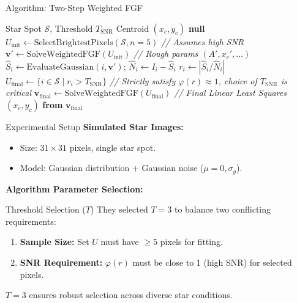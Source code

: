 \begin{frame}{Algorithm: Two-Step Weighted FGF}
    \begin{algorithm}[H]
    \scriptsize
    \caption{Two-Step Weighted Fast Gaussian Fitting}
    \begin{algorithmic}[1]
        \REQUIRE Star Spot $\mathcal{S}$, Threshold $T_{\text{SNR}}$
        \ENSURE Centroid $(x_c, y_c)$
            \RETURN \textbf{null}
        \ENDIF
        \STATE $U_{\text{init}} \gets \text{SelectBrightestPixels}(\mathcal{S}, n=5)$ \quad \textit{// Assumes high SNR}
        \STATE $\mathbf{v}' \gets \text{SolveWeightedFGF}(U_{\text{init}})$ \quad \textit{// Rough params $(A', x_c', \dots)$}
            \STATE $\hat{S}_i \gets \text{EvaluateGaussian}(i, \mathbf{v}')$; 
            \STATE $\hat{N}_i \gets I_i - \hat{S}_i$
            \STATE $r_i \gets |\hat{S}_i / \hat{N}_i|$
        \ENDFOR
        \STATE $U_{\text{final}} \gets \{ i \in \mathcal{S} \mid r_i > T_{\text{SNR}} \}$ \quad \textit{// Strictly satisfy $\varphi(r) \approx 1$, choice of $T_{\text{SNR}}$ is critical}
        \STATE $\mathbf{v}_{\text{final}} \gets \text{SolveWeightedFGF}(U_{\text{final}})$ \quad \textit{// Final Linear Least Squares}
        \RETURN $(x_c, y_c)$ \textbf{from} $\mathbf{v}_{\text{final}}$
    \end{algorithmic}
    \end{algorithm}
\end{frame}

\begin{frame}{Experimental Setup}
    \textbf{Simulated Star Images:}
    \begin{itemize}
        \item Size: $31 \times 31$ pixels, single star spot.
        \item Model: Gaussian distribution + Gaussian noise ($\mu=0, \sigma_g$).
    \end{itemize}

    \vspace{0.3cm}
    \textbf{Algorithm Parameter Selection:}
    \begin{block}{Threshold Selection ($T$)}
        They selected \textbf{$T=3$} to balance two conflicting requirements:
        \begin{enumerate}
            \item \textbf{Sample Size:} Set $U$ must have $\ge 5$ pixels for fitting.
            \item \textbf{SNR Requirement:} $\varphi(r)$ must be close to 1 (high SNR) for selected pixels.
        \end{enumerate}
        \small $T=3$ ensures robust selection across diverse star conditions.
    \end{block}
\end{frame}

